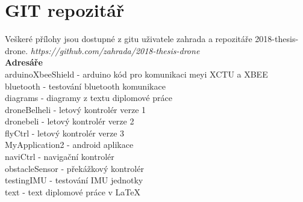 \chapter{GIT repozitář}
\label{user-guide}
Veškeré přílohy jsou dostupné z gitu uživatele zahrada a repozitáře 2018-thesis-drone. \textit{https://github.com/zahrada/2018-thesis-drone}\\

\textbf{Adresáře}\\
arduinoXbeeShield - arduino kód pro komunikaci meyi XCTU a XBEE\\
bluetooth -         testování bluetooth komunikace\\
diagrams -          diagramy z textu diplomové práce\\
droneBelheli -      letový kontrolér verze 1\\
dronebeli -         letový kontrolér verze 2\\
flyCtrl -           letový kontrolér verze 3\\
MyApplication2 -    android aplikace\\	
naviCtrl -          navigační kontrolér\\
obstacleSensor -    překážkový kontrolér\\
testingIMU -        testování IMU jednotky\\
text -              text diplomové práce v LaTeX\\
